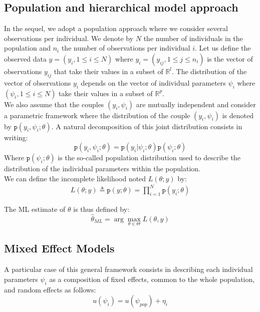 \documentclass[a4paper]{article}
\theoremstyle{plain}
\newcommand{\dens}{\texttt{p}}
\theoremstyle{plain}
\theoremstyle{definition}
\begin{document}
\subsection{Population and hierarchical model approach}

In the sequel, we adopt a population approach where we consider several observations per individual. We denote by $N$ the number of individuals in the population and $n_i$ the number of observations per individual $i$. Let us define the observed data $y = (y_i, 1\leq i \leq N)$ where $y_i = (y_{ij}, 1\leq j \leq n_i)$ is the vector of observations $y_{ij}$ that take their values in a subset of $\mathbb{R}^{l}$. The distribution of the vector of observations $y_i$ depends on the vector of individual parameters $\psi_i$ where $(\psi_i, 1\leq i \leq N)$ take their values in a subset of $\mathbb{R}^{p}$.\\
We also assume that the couples $(y_i,\psi_i)$ are mutually independent and consider a parametric framework where the distribution of the couple $(y_i,\psi_i)$ is denoted by $\dens(y_i,\psi_i;\theta)$. A  natural decomposition of this joint distribution consists in writing:
\begin{equation}
    \dens(y_i,\psi_i;\theta) = \dens(y_i|\psi_i;\theta)\dens(\psi_i;\theta)
\end{equation}
Where $\dens(\psi_i;\theta)$ is the so-called population distribution used to describe the distribution of the individual parameters within the population.\\
We can define the incomplete likelihood noted $L(\theta;y)$ by:
\begin{equation}
\begin{split}
L(\theta;y) \triangleq \dens(y;\theta)= \prod_{i=1}^{N}{\dens(y_i;\theta)}
\end{split} 
\end{equation}

The ML estimate of $\theta$ is thus defined by:
\begin{equation}
\hat{\theta}_{ML} = \arg \max \limits_{\theta \in \Theta} L(\theta,y)
\end{equation}



\subsection{Mixed Effect Models}
A particular case of this general framework consists in describing each individual parameters $\psi_i$ as a composition of fixed effects, common to the whole population, and random effects as follows:
\begin{equation}
\label{indiv_param}
u(\psi_i) = u(\psi_{pop})+\eta_i
\end{equation}
\end{document}
